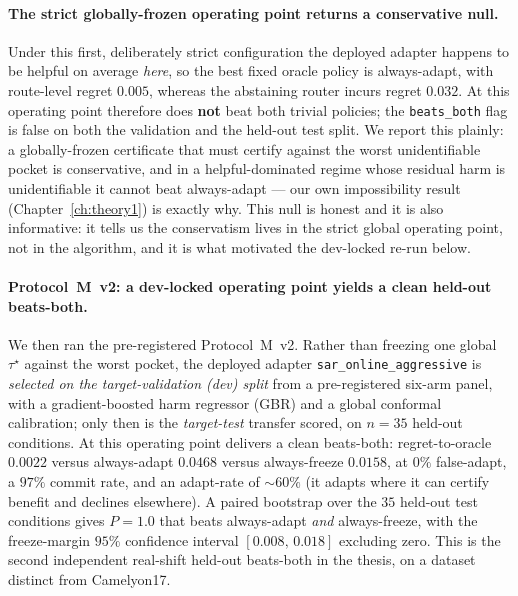 \paragraph{The strict globally-frozen operating point returns a conservative null.}
Under this first, deliberately strict configuration the deployed adapter happens to
be helpful on average \emph{here}, so the best fixed oracle policy is always-adapt,
with route-level regret $0.005$, whereas the abstaining router incurs regret
$0.032$.  At this operating point \KGA{} therefore does \textbf{not} beat both
trivial policies; the \texttt{beats\_both} flag is false on both the validation and
the held-out test split.  We report this plainly: a globally-frozen certificate
that must certify against the worst unidentifiable pocket is conservative, and in a
helpful-dominated regime whose residual harm is unidentifiable it cannot beat
always-adapt --- our own impossibility result (Chapter~\ref{ch:theory1}) is exactly
why.  This null is honest and it is also informative: it tells us the conservatism
lives in the strict global operating point, not in the algorithm, and it is what
motivated the dev-locked re-run below.

\paragraph{Protocol~M~v2: a dev-locked operating point yields a clean held-out beats-both.}
We then ran the pre-registered Protocol~M~v2.  Rather than freezing one global
$\tau^\star$ against the worst pocket, the deployed adapter
\texttt{sar\_online\_aggressive} is \emph{selected on the target-validation (dev)
split} from a pre-registered six-arm panel, with a gradient-boosted harm regressor
(GBR) and a global conformal calibration; only then is the \emph{target-test}
transfer scored, on $n{=}35$ held-out conditions.  At this operating point \KGA{}
delivers a clean beats-both: regret-to-oracle $0.0022$ versus always-adapt $0.0468$
versus always-freeze $0.0158$, at $0\%$ false-adapt, a $97\%$ commit rate, and an
adapt-rate of ${\sim}60\%$ (it adapts where it can certify benefit and declines
elsewhere).  A paired bootstrap over the $35$ held-out test conditions gives
$P{=}1.0$ that \KGA{} beats always-adapt \emph{and} always-freeze, with the
freeze-margin $95\%$ confidence interval $[0.008,\,0.018]$ excluding zero.  This is
the second independent real-shift held-out beats-both in the thesis, on a dataset
distinct from Camelyon17.

